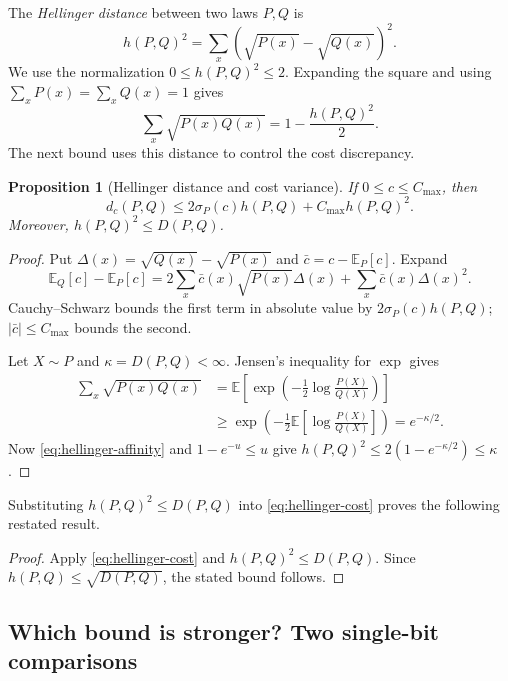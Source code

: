 \documentclass[11pt,twoside]{article}
\newcommand{\E}{\mathbb E}
\newcommand{\KL}{D}
\newtheorem{proposition}[theorem]{Proposition}
\theoremstyle{definition}
\theoremstyle{remark}
\begin{document}
The \emph{Hellinger distance} between two laws \(P,Q\) is
\[
 h(P,Q)^2=\sum_x(\sqrt{P(x)}-\sqrt{Q(x)})^2.
\]
We use the normalization \(0\le h(P,Q)^2\le2\).
Expanding the square and using \(\sum_xP(x)=\sum_xQ(x)=1\) gives
\begin{equation}
 \sum_x\sqrt{P(x)Q(x)}=1-\frac{h(P,Q)^2}{2}.
 \label{eq:hellinger-affinity}
\end{equation}
The next bound uses this distance to control the cost discrepancy.

\begin{proposition}[Hellinger distance and cost variance]
\label{prop:hellinger-cost}
If \(0\le c\le C_{\max}\), then
\begin{equation}
 d_c(P,Q)\le2\sigma_P(c)h(P,Q)+C_{\max}h(P,Q)^2.
 \label{eq:hellinger-cost}
\end{equation}
Moreover, \(h(P,Q)^2\le\KL(P, Q)\).
\end{proposition}

\begin{proof}
Put \(\Delta(x)=\sqrt{Q(x)}-\sqrt{P(x)}\) and
\(\bar c=c-\E_P[c]\). Expand
\[
 \E_Q[c]-\E_P[c]
 =2\sum_x\bar c(x)\sqrt{P(x)}\Delta(x)
   +\sum_x\bar c(x)\Delta(x)^2.
\]
Cauchy--Schwarz bounds the first term in absolute value by
\(2\sigma_P(c)h(P,Q)\); \(|\bar c|\le C_{\max}\) bounds the second.

Let \(X\sim P\) and \(\kappa=\KL(P,Q)<\infty\).
Jensen's inequality for \(\exp\) gives
\begin{align*}
 \sum_x\sqrt{P(x)Q(x)}
 &=\E\left[\exp\left(-\frac12\log\frac{P(X)}{Q(X)}\right)\right]\\
 &\ge\exp\left(-\frac12\E\left[\log\frac{P(X)}{Q(X)}\right]\right)
 =e^{-\kappa/2}.
\end{align*}
Now \cref{eq:hellinger-affinity} and \(1-e^{-u}\le u\) give
\(h(P,Q)^2\le2(1-e^{-\kappa/2})\le\kappa\).
\end{proof}

Substituting \(h(P,Q)^2\le\KL(P, Q)\) into
\cref{eq:hellinger-cost} proves the following restated result.

\forwardvariance*
\begin{proof}
Apply \cref{eq:hellinger-cost} and \(h(P,Q)^2\le\KL(P,Q)\). Since
\(h(P,Q)\le\sqrt{\KL(P,Q)}\), the stated bound follows.
\end{proof}

\subsection{Which bound is stronger? Two single-bit comparisons}
\label{app:bound-comparison}
\end{document}
